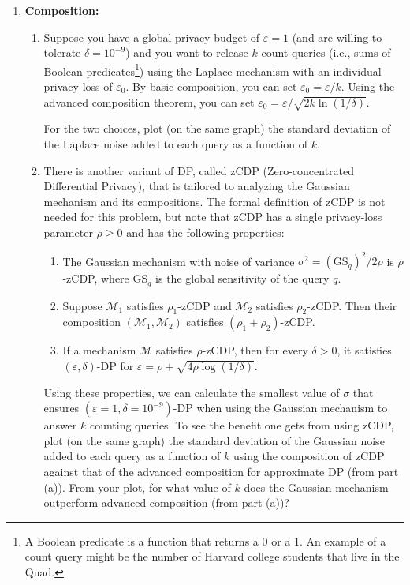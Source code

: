 \documentclass[11pt]{article}
\begin{document}
\begin{enumerate}[leftmargin=*]
        \item \textbf{Composition:}

        \begin{enumerate}
            \item  \label{part:optimal}
            Suppose you have a global privacy budget of $\varepsilon=1$ (and are willing to tolerate $\delta=10^{-9}$) and you want to release $k$ count queries (i.e., sums of Boolean predicates\footnote{A Boolean predicate is a function that returns a 0 or a 1. An example of a count query might be the
            number of Harvard college students that live in the Quad.}) using the Laplace mechanism with an individual privacy loss of $\varepsilon_0$.  By basic composition, you can set
            $\varepsilon_0=\varepsilon/k$.   Using the advanced composition theorem, you can set
            $\varepsilon_0=\varepsilon /\sqrt{2k\ln(1/\delta)}$.

            For the two choices, plot (on the same graph) the standard deviation of the Laplace noise added to each query as a function of $k$.



            \item
            There is another variant of DP, called zCDP
            (Zero-concentrated Differential Privacy), that is tailored to analyzing the Gaussian mechanism and its compositions. The formal definition of zCDP is not needed for this problem, but note that zCDP has a single privacy-loss parameter $\rho\geq 0$ and has the following properties:
            \begin{enumerate}
                \item The Gaussian mechanism with noise of variance $\sigma^2 = (\mathrm{GS}_q)^2/2\rho$ is $\rho$-zCDP, where
                $\mathrm{GS}_q$ is the global sensitivity of the query
                $q$.
                \item Suppose $\mathcal{M}_1$ satisfies $\rho_1$-zCDP and $\mathcal{M}_2$ satisfies $\rho_2$-zCDP. Then their composition $(\mathcal{M}_1, \mathcal{M}_2)$ satisfies $(\rho_1+\rho_2)$-zCDP.
                \item If a mechanism $\mathcal{M}$ satisfies $\rho$-zCDP, then for every $\delta>0$, it satisfies $(\varepsilon,\delta)$-DP for  $\varepsilon=\rho+\sqrt{4\rho\log(1/\delta)}.$
            \end{enumerate}
            Using these properties, we can calculate the smallest value of $\sigma$ that ensures $(\varepsilon=1,\delta=10^{-9})$-DP when using the Gaussian mechanism to answer $k$ counting queries. To see the benefit one gets from
            using zCDP, plot (on the same graph) the standard deviation of the Gaussian noise added to each query as a function of $k$ using the composition of zCDP against that of the advanced composition for approximate DP (from part (a)).
            From your plot, for what value of $k$ does the Gaussian mechanism outperform advanced composition (from part (a))?
        \end{enumerate}

    \end{enumerate}
\end{document}
